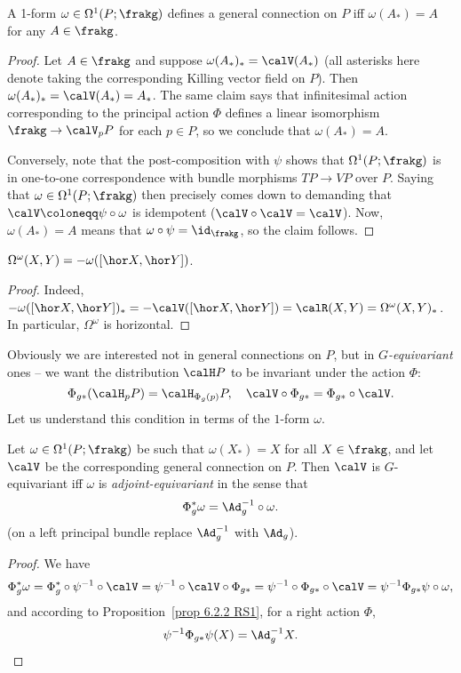 \begin{prop}
    A 1-form $\omega\in\Omega^1(P;\frakg)$ defines a general connection on $P$ iff $\omega(A_\ast)=A$ for any $A\in\frakg$.
\end{prop}
\begin{proof}
    Let $A\in\frakg$ and suppose $\omega(A_\ast)_\ast=\calV(A_\ast)$ (all asterisks here denote taking the corresponding Killing vector field on $P$).  Then $\omega(A_\ast)_\ast=\calV(A_\ast)=A_\ast$. The same claim says that infinitesimal action corresponding to the principal action $\Phi$ defines a linear isomorphism $\frakg\to \calV_pP$ for each $p\in P$, so we conclude that $\omega(A_\ast)=A$. 

    Conversely, note that the post-composition with $\psi$ shows that $\Omega^1(P;\frakg)$ is in one-to-one correspondence with bundle morphisms $TP\to VP$ over $P$. Saying that $\omega\in\Omega^1(P;\frakg)$ then precisely comes down to demanding that $\calV\coloneqq \psi\circ\omega$ is idempotent ($\calV\circ\calV=\calV$). Now, $\omega(A_\ast)=A$ means that $\omega\circ\psi=\id_\frakg$, so the claim follows.
\end{proof}
\begin{cor}\label{cor curvature 2-form}
    $\Omega^\omega(X,Y)=-\omega([\hor X,\hor Y])$.
\end{cor}
\begin{proof}
    Indeed, $-\omega([\hor X,\hor Y])_\ast=-\calV([\hor X,\hor Y])=\calR(X,Y)=\Omega^\omega(X,Y)_\ast$. In particular, $\Omega^\omega$ is horizontal.
\end{proof}

Obviously we are interested not in general connections on $P$, but in \emph{$G$-equivariant} ones -- we want the distribution $\calH P$ to be invariant under the action $\Phi$:
\[\Phi_{g\ast}(\calH_pP)=\calH_{\Phi_g(p)}P,\quad \calV\circ \Phi_{g\ast}=\Phi_{g\ast}\circ \calV.\]
Let us understand this condition in terms of the $1$-form $\omega$.

\begin{prop}
    Let $\omega\in\Omega^1(P;\frakg)$ be such that $\omega(X_\ast)=X$ for all $X\in\frakg$, and let $\calV$ be the corresponding general connection on $P$. Then $\calV$ is $G$-equivariant iff $\omega$ is \emph{adjoint-equivariant} in the sense that 
    \[\Phi_g^\ast\omega=\Ad_{g}^{-1}\circ\omega.\]
    (on a left principal bundle replace $\Ad_g^{-1}$ with $\Ad_g$).
\end{prop}
\begin{proof}
    We have
    \[\Phi^\ast_g\omega=\Phi^\ast_g\circ\psi^{-1}\circ \calV=\psi^{-1}\circ\calV\circ \Phi_{g\ast}=\psi^{-1}\circ\Phi_{g\ast}\circ\calV=\psi^{-1}\Phi_{g\ast}\psi\circ\omega,\]
    and according to Proposition~\ref{prop 6.2.2 RS1}, for a right action $\Phi$,
    \[\psi^{-1}\Phi_{g\ast}\psi(X)=\Ad_g^{-1}X.\]
\end{proof}


